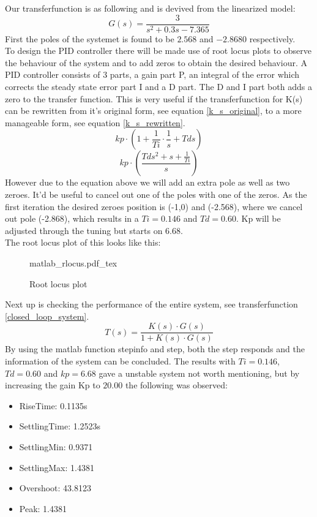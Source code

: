 \documentclass[12pt]{article}
\begin{document}
Our transferfunction is as following and is devived from the linearized model:
\begin{equation} \label{G_s}
  G(s) = \frac{3}{s^2 + 0.3s -7.365}
\end{equation}
First the poles of the systemet is found to be $2.568$ and $-2.8680$ respectively.\\
To design the PID controller there will be made use of root locus plots to observe the behaviour of the system and to add zeros to obtain the desired behaviour. A PID controller consists of 3 parts, a gain part P, an integral of the error which corrects the steady state error part I and a D part. The D and I part both adds a zero to the transfer function. This is very useful if the transferfunction for K(s) can be rewritten from it's original form, see equation \ref{k_s_original}, to a more manageable form, see equation \ref{k_s_rewritten}.
\begin{equation} \label{k_s_original}
  kp\cdot(1+\frac{1}{Ti}\cdot \frac{1}{s}+Tds)
\end{equation}
\begin{equation} \label{k_s_rewritten}
  kp\cdot(\frac{Tds^2 + s + \frac{1}{Ti}}{s})
\end{equation}
However due to the equation above we will add an extra pole as well as two zeroes. It'd be useful to cancel out one of the poles with one of the zeros. As the first iteration the desired zeroes position is (-1,0) and (-2.568), where we cancel out pole (-2.868), which results in a $Ti = 0.146$ and $Td = 0.60$. Kp will be adjusted through the tuning but starts on $6.68$.\\
The root locus plot of this looks like this:
\begin{figure}[H]
  \centering
  \def\svgwidth{\textwidth}
  {matlab_rlocus.pdf_tex}
  \caption{Root locus plot} \label{my_root_locus_plot}
\end{figure}
Next up is checking the performance of the entire system, see transferfunction \ref{closed_loop_system}.
\begin{equation} \label{closed_loop_system}
    T(s) = \frac{K(s) \cdot G(s)}{1+K(s)\cdot G(s)}
\end{equation}
By using the matlab function stepinfo and step, both the step responds and the information of the system can be concluded. The results with $Ti = 0.146$, $Td = 0.60$ and $kp = 6.68$ gave a unstable system not worth mentioning, but by increasing the gain Kp to $20.00$ the following was observed:
\begin{itemize}
  \item RiseTime: 0.1135s
  \item SettlingTime: 1.2523s
  \item SettlingMin: 0.9371
  \item SettlingMax: 1.4381
  \item Overshoot: 43.8123
  \item Peak: 1.4381
\end{itemize}
\end{document}
